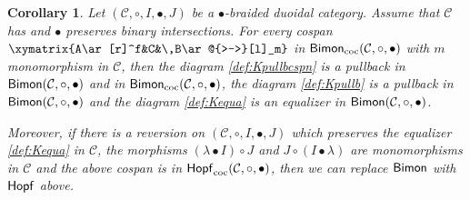 \documentclass[nosumlimits,twoside]{amsart}
\newtheorem{corollary}[corollary]{\sc Corollary}
\theoremstyle{definition}
\theoremstyle{remark}
\newcommand{\rd}[1]{{\color{red}{#1}}}
\newcommand{\Cc}{\mathcal{C}}
\def\Bimon{{\sf Bimon}}
\def\Hopfmon{{\sf Hopf}}
\def\cHopfmon{{\sf Hopf}_{\mathrm{coc}}}
\def\cBimon{{\sf Bimon}_{\mathrm{coc}}}
\begin{document}
\begin{corollary}%
\label{coro:ddpulb}
Let $\left( \mathcal{C},\circ ,I,\bullet ,J\right) $ be a $\bullet $-braided duoidal category. Assume that $\mathcal{C}$ has and $\bullet$ preserves binary intersections.
For every cospan
$\xymatrix{A\ar[r]^f&C&\,B\ar@{>->}[l]_m}$ in $\cBimon(\Cc,\circ,\bullet)$  with $m$ monomorphism in $\Cc$,
then the diagram \eqref{def:Kpullbcspn} is a pullback in $\Bimon (\Cc,\circ,\bullet)$ and in $\cBimon(\Cc,\circ,\bullet)$,
the diagram \eqref{def:Kpullb} is a pullback
 in $\Bimon(\Cc,\circ,\bullet)$ and the diagram \eqref{def:Kequa} is an equalizer  in $\Bimon(\Cc,\circ,\bullet)$.

Moreover, if there is a reversion on $\left( \mathcal{C}%
,\circ ,I,\bullet ,J\right) $ which preserves the equalizer \eqref{def:Kequa} in $\Cc$, the morphisms $\left( \lambda\bullet I\right) \circ J$ and $J\circ \left( I\bullet \lambda\right)$ are monomorphisms in $\Cc$ and the above cospan is in $\cHopfmon(\Cc,\circ,\bullet)$, then we can replace $\Bimon$ with $\Hopfmon$ above.
\end{corollary}
\end{document}
